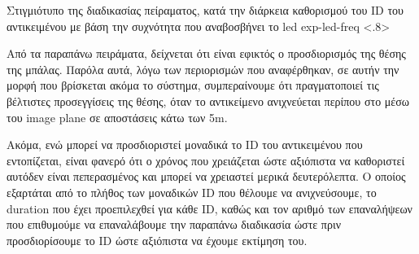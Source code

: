 {Στιγμιότυπο της διαδικασίας πείραματος, κατά την διάρκεια καθορισμού του ID του αντικειμένου με βάση την συχνότητα που αναβοσβήνει το led}%
{exp-led-freq}%
<.8>

Από τα παραπάνω πειράματα, δείχνεται ότι είναι εφικτός ο προσδιορισμός της θέσης της μπάλας. Παρόλα αυτά, λόγω των περιορισμών που αναφέρθηκαν, σε αυτήν την μορφή που βρίσκεται ακόμα το σύστημα, συμπεραίνουμε ότι πρα\-γμα\-το\-ποι\-εί τις βέλτιστες προσεγγίσεις της θέσης, όταν το αντικείμενο ανιχνεύεται περίπου στο μέσω του image plane σε αποστάσεις κάτω των 5m.

Ακόμα, ενώ μπορεί να προσδιοριστεί μοναδικά το ID του αντικειμένου που εντοπίζεται, είναι φανερό ότι ο χρόνος που χρειάζεται ώστε αξιόπιστα να καθοριστεί αυτό\udot δεν είναι πεπερασμένος και μπορεί να χρειαστεί μερικά δευτερόλεπτα. Ο οποίος εξαρτάται από το πλήθος των μοναδικών ID που θέλουμε να ανιχνεύσουμε, το duration που έχει προεπιλεχθεί για κάθε ID, καθώς και τον αριθμό των επαναλήψεων που επιθυμούμε να επαναλάβουμε την παραπάνω διαδικασία ώστε πριν προσδιορίσουμε το ID ώστε αξιόπιστα να έχουμε εκτίμηση του.






